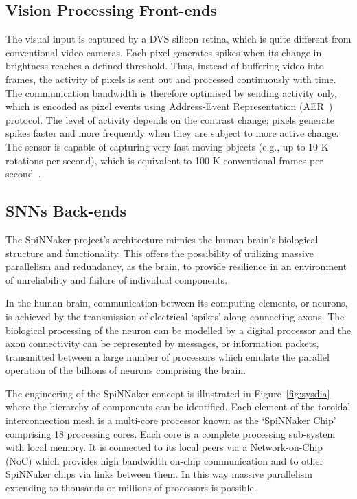 \subsection{Vision Processing Front-ends}
The visual input is captured by a DVS silicon retina, which is quite different from conventional video cameras.
Each pixel generates spikes when its change in brightness reaches a defined threshold.
Thus, instead of buffering video into frames, the activity of pixels is sent out and processed continuously with time.
The communication bandwidth is therefore optimised by sending activity only, which is encoded as pixel events using Address-Event Representation (AER~\cite{lazzaro1995multi}) protocol.
The level of activity depends on the contrast change; pixels generate spikes faster and more frequently when they are subject to more active change.
The sensor is capable of capturing very fast moving objects (e.g., up to 10 K rotations per second), which is equivalent to 100 K conventional frames per second~\cite{lenero20113}.

\subsection{SNNs Back-ends}
The SpiNNaker project's architecture mimics the human brain's biological structure and functionality. 
This offers the possibility of utilizing massive parallelism and redundancy, as the brain, to provide resilience in an environment of unreliability and failure of individual components.

In the human brain, communication between its computing elements, or neurons, is achieved by the transmission of electrical `spikes' along connecting axons. 
The biological processing of the neuron can be modelled by a digital processor and the axon connectivity can be represented by messages, or information packets, transmitted between a large number of processors which emulate the parallel operation of the billions of neurons comprising the brain.

The engineering of the SpiNNaker concept is illustrated in Figure~\ref{fig:sysdia} where the hierarchy of components can be identified. 
Each element of the toroidal interconnection mesh is a multi-core processor known as the `SpiNNaker Chip' comprising 18 processing cores. 
Each core is a complete processing sub-system with local memory.
It is connected to its local peers via a Network-on-Chip (NoC) which provides high bandwidth on-chip communication and to other SpiNNaker chips via links between them. 
In this way massive parallelism extending to thousands or millions of processors is possible.

